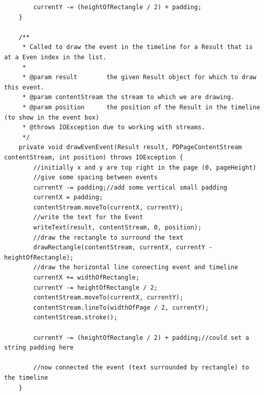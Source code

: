 \begin{lstlisting}
        currentY -= (heightOfRectangle / 2) + padding;
    }

    /**
     * Called to draw the event in the timeline for a Result that is at a Even index in the list.
     *
     * @param result        the given Result object for which to draw this event.
     * @param contentStream the stream to which we are drawing.
     * @param position      the position of the Result in the timeline (to show in the event box)
     * @throws IOException due to working with streams.
     */
    private void drawEvenEvent(Result result, PDPageContentStream contentStream, int position) throws IOException {
        //initially x and y are top right in the page (0, pageHeight)
        //give some spacing between events
        currentY -= padding;//add some vertical small padding
        currentX = padding;
        contentStream.moveTo(currentX, currentY);
        //write the text for the Event
        writeText(result, contentStream, 0, position);
        //draw the rectangle to surround the text
        drawRectangle(contentStream, currentX, currentY - heightOfRectangle);
        //draw the horizontal line connecting event and timeline
        currentX += widthOfRectangle;
        currentY -= heightOfRectangle / 2;
        contentStream.moveTo(currentX, currentY);
        contentStream.lineTo(widthOfPage / 2, currentY);
        contentStream.stroke();

        currentY -= (heightOfRectangle / 2) + padding;//could set a string padding here

        //now connected the event (text surrounded by rectangle) to the timeline
    }


\end{lstlisting}
